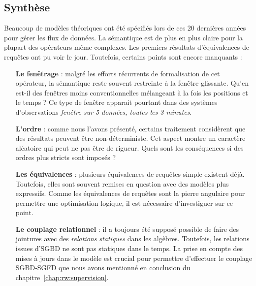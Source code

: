 \subsection{Synthèse}\label{sec:rw:sgfd:modeles:synthese}
Beaucoup de modèles théoriques ont été spécifiés lors de ces 20 dernières années pour gérer les flux de données. La sémantique est de plus en plus claire pour la plupart des opérateurs même complexes. Les premiers résultats d'équivalences de requêtes ont pu voir le jour. Toutefois, certains points sont encore manquants :
\begin{itemize}
 \item[\textbf{Le fenêtrage}] : malgré les efforts récurrents de formalisation de cet opérateur, la sémantique reste souvent restreinte à la fenêtre glissante. Qu'en est-il des fenêtres moins conventionnelles mélangeant à la fois les positions et le temps ? Ce type de fenêtre apparait pourtant dans des systèmes d'observations \textit{fenêtre sur 5 données, toutes les 3 minutes}.
 \item[\textbf{L'ordre}] : comme nous l'avons présenté, certains traitement considèrent que des résultats peuvent être non-déterministe. Cet aspect montre un caractère aléatoire qui peut ne pas être de rigueur. Quels sont les conséquences si des ordres plus stricts sont imposés ?
 \item[\textbf{Les équivalences}] : plusieurs équivalences de requêtes simple existent déjà. Toutefois, elles sont souvent remises en question avec des modèles plus expressifs. Comme les équivalences de requêtes sont la pierre angulaire pour permettre une optimisation logique, il est nécessaire d'investiguer sur ce point.
 \item[\textbf{Le couplage relationnel}] : il a toujours été supposé possible de faire des jointures avec des \textit{relations statiques} dans les algèbres. Toutefois, les relations issues d'SGBD ne sont pas statiques dans le temps. La prise en compte des mises à jours dans le modèle est crucial pour permettre d'effectuer le couplage SGBD-SGFD que nous avons mentionné en conclusion du chapitre~\ref{chap:rw:supervision}.
\end{itemize}

